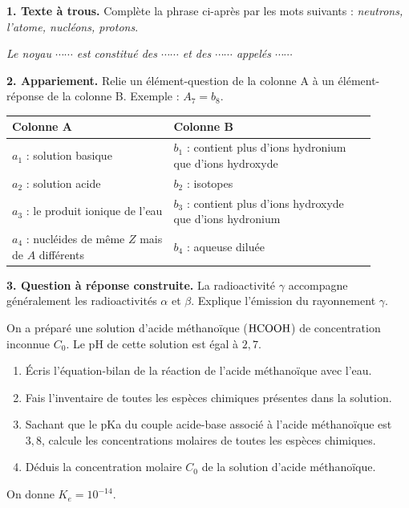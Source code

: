 \documentclass[11pt]{article}
\begin{document}



\noindent\textbf{1. Texte à trous.} Complète la phrase ci-après par les mots suivants : \textit{neutrons, l'atome, nucléons, protons}.

\textit{Le noyau $\cdots\cdots$ est constitué des $\cdots\cdots$ et des $\cdots\cdots$ appelés $\cdots\cdots$}

\medskip
\noindent\textbf{2. Appariement.} Relie un élément-question de la colonne A à un élément-réponse de la colonne B. Exemple : $A_7 = b_8$.

\begin{center}\renewcommand{\arraystretch}{1.6}
\begin{tabular}{|p{0.4\linewidth}|p{0.5\linewidth}|}
\hline
\textbf{Colonne A} & \textbf{Colonne B} \\
\hline
$a_1$ : solution basique & $b_1$ : contient plus d'ions hydronium que d'ions hydroxyde \\
\hline
$a_2$ : solution acide & $b_2$ : isotopes \\
\hline
$a_3$ : le produit ionique de l'eau & $b_3$ : contient plus d'ions hydroxyde que d'ions hydronium \\
\hline
$a_4$ : nucléides de même $Z$ mais de $A$ différents & $b_4$ : aqueuse diluée \\
\hline
\end{tabular}
\end{center}

\noindent\textbf{3. Question à réponse construite.} La radioactivité $\gamma$ accompagne généralement les radioactivités $\alpha$ et $\beta$. Explique l'émission du rayonnement $\gamma$.

On a préparé une solution d'acide méthanoïque ($\mathrm{HCOOH}$) de concentration inconnue $C_0$. Le pH de cette solution est égal à $2{,}7$.

\begin{enumerate}
  \item Écris l'équation-bilan de la réaction de l'acide méthanoïque avec l'eau.
  \item Fais l'inventaire de toutes les espèces chimiques présentes dans la solution.
  \item Sachant que le pKa du couple acide-base associé à l'acide méthanoïque est $3{,}8$, calcule les concentrations molaires de toutes les espèces chimiques.
  \item Déduis la concentration molaire $C_0$ de la solution d'acide méthanoïque.
\end{enumerate}
\noindent On donne $K_e = 10^{-14}$.
\end{document}
